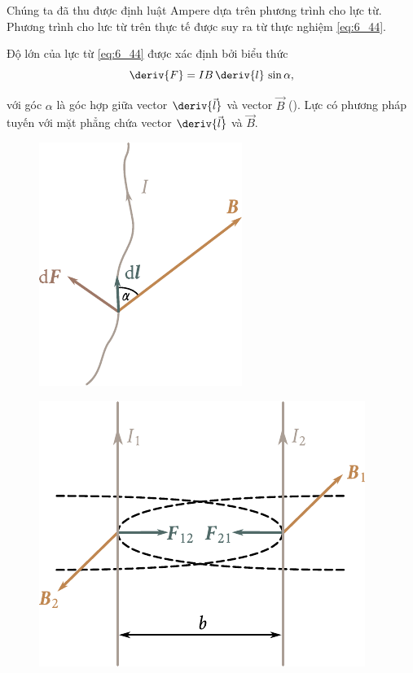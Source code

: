Chúng ta đã thu được định luật Ampere dựa trên phương trình  cho lực từ. Phương trình cho lưc từ trên thực tế được suy ra từ thực nghiệm \eqref{eq:6_44}.

Độ lớn của lực từ \eqref{eq:6_44} được xác định bởi biểu thức
\begin{equation}\label{eq:6_45}
    \deriv{F} = I B\, \deriv{l}\, \sin\alpha,
\end{equation}

\noindent
với góc $\alpha$ là góc hợp giữa vector $\deriv{\vec{l}}$ và vector $\vec{B}$ (). Lực có phương pháp tuyến với mặt phẳng chứa vector $\deriv{\vec{l}}$ và $\vec{B}$.

\begin{figure}[t]
	\begin{minipage}[t]{0.35\linewidth}
		\begin{center}
			\includegraphics[scale=1]{figures/ch_06/fig_6_9.pdf}
			\caption[]{}
			\label{fig:6_9}
		\end{center}
	\end{minipage}
	\hfill{ }%
	\begin{minipage}[t]{0.59\linewidth}
		\begin{center}
			\includegraphics[scale=1]{figures/ch_06/fig_6_10.pdf}
			\caption[]{}
			\label{fig:6_10}
		\end{center}
	\end{minipage}
\vspace{-0.4cm}
\end{figure}

